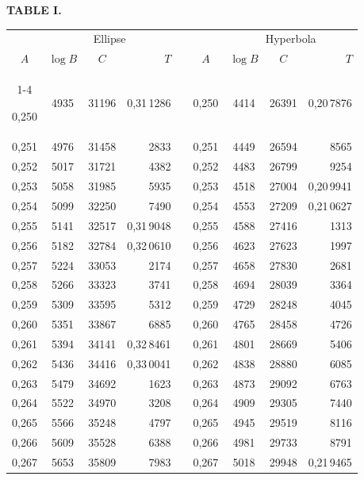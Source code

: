 \endgroup
\clearpage
{}
\begingroup
\centering
\fontsize{9}{9}\selectfont
\setlength{\tabcolsep}{6pt}
\renewcommand{\arraystretch}{1}
\setlength{\parskip}{0pt}
\textbf{TABLE I.}
\par\vspace{7pt}
\begin{tabular}{|c|c|c|r|@{}p{9pt}@{}|c|c|c|r|}
\hline
\rule{0pt}{8.5pt} & \multicolumn{3}{c|}{Ellipse} & & & \multicolumn{3}{c|}{Hyperbola} \\
\(A\) & \(\log B\) & \(C\) & \(T\) & & \(A\) & \(\log B\) & \(C\) & \(T\) \\
\cline{1-4}\cline{6-9}
\rule{0pt}{8.5pt}0,250 & 4935 & 31196 & 0,31\,1286 &  & 0,250 & 4414 & 26391 & 0,20\,7876 \\
0,251 & 4976 & 31458 & 2833 &  & 0,251 & 4449 & 26594 & 8565 \\
0,252 & 5017 & 31721 & 4382 &  & 0,252 & 4483 & 26799 & 9254 \\
0,253 & 5058 & 31985 & 5935 &  & 0,253 & 4518 & 27004 & 0,20\,9941 \\
0,254 & 5099 & 32250 & 7490 &  & 0,254 & 4553 & 27209 & 0,21\,0627 \\
0,255 & 5141 & 32517 & 0,31\,9048 &  & 0,255 & 4588 & 27416 & 1313 \\[3pt]
0,256 & 5182 & 32784 & 0,32\,0610 &  & 0,256 & 4623 & 27623 & 1997 \\
0,257 & 5224 & 33053 & 2174 &  & 0,257 & 4658 & 27830 & 2681 \\
0,258 & 5266 & 33323 & 3741 &  & 0,258 & 4694 & 28039 & 3364 \\
0,259 & 5309 & 33595 & 5312 &  & 0,259 & 4729 & 28248 & 4045 \\
0,260 & 5351 & 33867 & 6885 &  & 0,260 & 4765 & 28458 & 4726 \\[3pt]
0,261 & 5394 & 34141 & 0,32\,8461 &  & 0,261 & 4801 & 28669 & 5406 \\
0,262 & 5436 & 34416 & 0,33\,0041 &  & 0,262 & 4838 & 28880 & 6085 \\
0,263 & 5479 & 34692 & 1623 &  & 0,263 & 4873 & 29092 & 6763 \\
0,264 & 5522 & 34970 & 3208 &  & 0,264 & 4909 & 29305 & 7440 \\
0,265 & 5566 & 35248 & 4797 &  & 0,265 & 4945 & 29519 & 8116 \\[3pt]
0,266 & 5609 & 35528 & 6388 &  & 0,266 & 4981 & 29733 & 8791 \\
0,267 & 5653 & 35809 & 7983 &  & 0,267 & 5018 & 29948 & 0,21\,9465 \\

\end{tabular}
